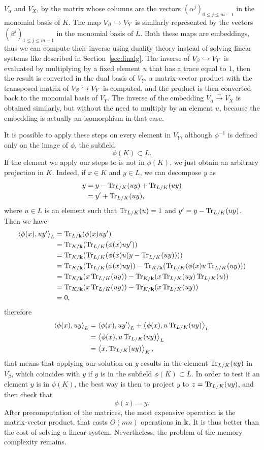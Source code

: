 $V_\alpha$ and $V_X$, by the matrix whose columns are the vectors
$(\alpha^j)_{0\leq j \leq m-1}$ in the monomial basis of $K$. The map
$V_\beta\hookrightarrow V_Y$ is similarly represented by the vectors
$(\beta^{j})_{1\leq j\leq m-1}$ in the monomial basis of $L$. Both these
maps are embeddings, thus we can compute their inverse using duality
theory instead of solving linear systems like described in
Section~\ref{sec:linalg}. The inverse of $V_\beta\hookrightarrow V_Y$ is evaluated by
multiplying by a fixed element $u$ that has a trace equal to $1$, then the
result is converted in the dual basis of $V_Y$, a matrix-vector product with the
transposed matrix of $V_\beta\hookrightarrow V_Y$ is computed, and the product is then
converted back to the monomial basis of $V_Y$. The inverse of the embedding
$V_\alpha\overset{\sim}{\to}V_X$ is obtained similarly, but without the need to
multiply by an element $u$, because the embedding is actually an isomorphism in
that case.

It is possible to apply these steps on every element in $V_Y$, although
$\phi^{-1}$ is defined only on the image of $\phi$, \ie the subfield
\[
  \phi(K)\subset L.
\]
If the element we apply our steps to is not in $\phi(K)$, we just obtain an
arbitrary projection in $K$. Indeed, if $x\in K$ and $y\in L$, we can decompose
$y$ as
\begin{align*}
  y &= y - \operatorname{Tr}_{L/K}(uy) + \operatorname{Tr}_{L/K}(uy)\\
  &= y' + \operatorname{Tr}_{L/K}(uy),
\end{align*}
where $u\in L$ is an element such that $\operatorname{Tr}_{L/K}(u)=1$ and
$y'=y-\operatorname{Tr}_{L/K}(uy)$. Then we have
\begin{align*}
  \left\langle\phi(x),uy'\right\rangle_L &= \operatorname{Tr}_{L/\mathbf{k}}(\phi(x)uy')\\
  &= \operatorname{Tr}_{K/\mathbf{k}}(\operatorname{Tr}_{L/K}(\phi(x)uy'))\\
  &= \operatorname{Tr}_{K/\mathbf{k}}(\operatorname{Tr}_{L/K}(\phi(x)u(y-\operatorname{Tr}_{L/K}(uy))))\\
  &=
  \operatorname{Tr}_{K/\mathbf{k}}(\operatorname{Tr}_{L/K}(\phi(x)uy))-\operatorname{Tr}_{K/\mathbf{k}}(\operatorname{Tr}_{L/K}(\phi(x)u\operatorname{Tr}_{L/K}(uy)))\\
  &= \operatorname{Tr}_{K/\mathbf{k}}(x\operatorname{Tr}_{L/K}(uy))-\operatorname{Tr}_{K/\mathbf{k}}(x\operatorname{Tr}_{L/K}(uy)\operatorname{Tr}_{L/K}(u))\\
  &= \operatorname{Tr}_{K/\mathbf{k}}(x\operatorname{Tr}_{L/K}(uy))-\operatorname{Tr}_{K/\mathbf{k}}(x\operatorname{Tr}_{L/K}(uy))\\
  &= 0,
\end{align*}
therefore
\begin{align*}
  \left\langle\phi(x),uy\right\rangle_L &= \left\langle\phi(x),uy'\right\rangle_L+\left\langle\phi(x),u\operatorname{Tr}_{L/K}(uy)\right\rangle_L\\
  &= \left\langle\phi(x),u\operatorname{Tr}_{L/K}(uy)\right\rangle_L\\
  &= \left\langle x,\operatorname{Tr}_{L/K}(uy)\right\rangle_K,
\end{align*}
that means that applying our solution on $y$ results in the element
$\operatorname{Tr}_{L/K}(uy)$ in $V_\beta$, which coincides with $y$ if $y$ is in the subfield
$\phi(K)\subset L$. In order to test if an element $y$ is in $\phi(K)$, the best
way is then to project $y$ to $z = \operatorname{Tr}_{L/K}(uy)$, and then check that
\[
  \phi(z) = y.
\]
After precomputation of the matrices, the most expensive operation is the
matrix-vector product, that costs $O(mn)$ operations in $\mathbf{k}$. It is thus better
than the cost of solving a linear system. Nevertheless, the problem of the memory
complexity remains.

